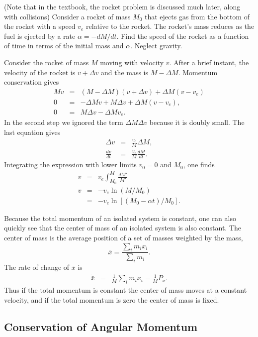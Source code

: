 \example
(Note that in the textbook, the rocket problem is discussed much later, along with collisions) Consider a rocket of mass $M_0$ that ejects gas from the bottom of the rocket with a speed $v_e$ relative to the rocket. The rocket's mass reduces as the fuel is ejected by a rate $\alpha=-dM/dt$. Find the speed of the rocket as a function of time in terms of the initial mass and $\alpha$. Neglect gravity.

Consider the rocket of mass $M$ moving with velocity $v$. After a brief instant, the velocity of the rocket is $v+\Delta v$ and the mass is $M-\Delta M$. Momentum conservation gives
\begin{eqnarray*}
Mv&=&(M-\Delta M)(v+\Delta v)+\Delta M(v-v_e)\\
0&=&-\Delta Mv+M\Delta v+\Delta M(v-v_e),\\
0&=&M\Delta v-\Delta Mv_e.
\end{eqnarray*}
In the second step we ignored the term $\Delta M\Delta v$ because it is doubly small. The last equation gives
\begin{eqnarray}
\Delta v&=&\frac{v_e}{M}\Delta M,\\
\nonumber
\frac{dv}{dt}&=&\frac{v_e}{M}\frac{dM}{dt}.
\end{eqnarray}
Integrating the expression with lower limits $v_0=0$ and $M_0$, one finds
\begin{eqnarray*}
v&=&v_e\int_{M_0}^M \frac{dM'}{M'}\\
v&=&-v_e\ln(M/M_0)\\
&=&-v_e\ln[(M_0-\alpha t)/M_0].
\end{eqnarray*}
\exampleend

Because the total momentum of an isolated system is constant, one can also quickly see that the center of mass of an isolated system is also constant. The center of mass is the average position of a set of masses weighted by the mass,
\begin{equation}
\bar{x}=\frac{\sum_im_ix_i}{\sum_i m_i}.
\end{equation}
The rate of change of $\bar{x}$ is
\begin{eqnarray}
\dot{\bar{x}}&=&\frac{1}{M}\sum_i m_i\dot{x}_i=\frac{1}{M}P_x.
\end{eqnarray}
Thus if the total momentum is constant the center of mass moves at a constant velocity, and if the total momentum is zero the center of mass is fixed.

\subsection{Conservation of Angular Momentum}
\label{sec:angmomentum}

